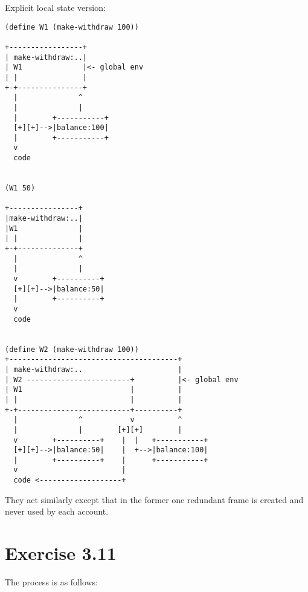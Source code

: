 \documentclass[../main.tex]{subfiles}
\begin{document}
Explicit local state version:

\begin{lstlisting}
(define W1 (make-withdraw 100))

+-----------------+
| make-withdraw:..|
| W1              |<- global env
| |               |
+-+---------------+
  |              ^
  |              |
  |        +-----------+
  [+][+]-->|balance:100|
  |        +-----------+
  v
  code


(W1 50)

+----------------+
|make-withdraw:..|
|W1              |
| |              |
+-+--------------+
  |              ^
  |              |
  v        +----------+
  [+][+]-->|balance:50|
  |        +----------+
  v
  code


(define W2 (make-withdraw 100))
+---------------------------------------+
| make-withdraw:..                      |
| W2 ------------------------+          |<- global env
| W1                         |          |
| |                          |          |
+-+--------------------------+----------+
  |              ^           v          ^
  |              |        [+][+]        |
  v        +----------+    |  |   +-----------+
  [+][+]-->|balance:50|    |  +-->|balance:100|
  |        +----------+    |      +-----------+
  v                        |
  code <-------------------+
\end{lstlisting}

They act similarly except that in the former one
 redundant frame is created and never used
 by each account.
 
\section{Exercise 3.11}

The process is as follows:
\end{document}
